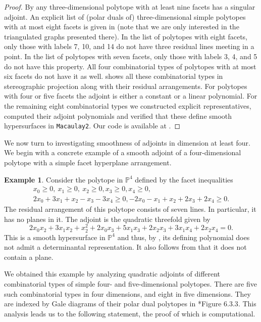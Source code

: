 \documentclass[a4paper,10pt]{amsart}
\theoremstyle{definition}
\newtheorem{ex}[Def]{Example}
\theoremstyle{plain}
\begin{document}
\begin{proof}
By  any three-dimensional polytope with at least nine facets has a singular adjoint. An explicit list of (polar duals of) three-dimensional simple polytopes with at most eight facets is given in \cite{BrittonDunitz73Polytopes} (note that we are only interested in the triangulated graphs presented there). In the list of polytopes with eight facets, only those with labels 7, 10, and 14 do not have three residual lines meeting in a point. In the list of polytopes with seven facets, only those with labels 3, 4, and 5 do not have this property. All four combinatorial types of polytopes with at most six facets do not have it as well.  shows all these combinatorial types in stereographic projection along with their residual arrangements. 
For polytopes with four or five facets the adjoint is either a constant or a linear polynomial. 
For the remaining eight combinatorial types we constructed explicit representatives, computed their adjoint polynomials and verified that these define smooth hypersurfaces in \texttt{Macaulay2}. Our code is available at \cite{detrepscode}.
\end{proof}

We now turn to investigating smoothness of adjoints in dimension at least four. We begin with  a concrete example of a smooth adjoint of a four-dimensional polytope with a simple facet hyperplane arrangement.

\begin{ex} \label{ex:counter}
    Consider the polytope in $\mathbb{P}^4$ defined by the facet inequalities
    \begin{multline*}
        x_0\geq 0,\ x_1\geq 0,\ x_2\geq 0, x_3\geq 0, x_4\geq 0,\\ 2x_0+3x_1+x_2-x_3-3x_4\geq 0,-2x_0-x_1+x_2+2x_3+2x_4\geq 0.
    \end{multline*}
    The residual arrangement of this polytope consists of seven lines. In particular, it has no planes in it. The adjoint is the quadratic threefold given by
    $$2x_0x_2 + 3x_1x_2 + x_2^2  + 2x_0x_3 + 5x_1x_3 + 2x_2x_3 + 3x_1x_4 + 2x_2x_4=0.$$
    This is a smooth hypersurface in $\mathbb{P}^4$ and thus, by , its defining polynomial does not admit a determinantal representation. It also follows from  that it does not contain a plane.
\end{ex}

We obtained this example by analyzing quadratic adjoints of different combinatorial types of simple four- and five-dimensional polytopes. There are five such combinatorial types in four dimensions, and eight in five dimensions. They are indexed by Gale diagrams of their polar dual polytopes in \cite{grunbaum1967convex}*{Figure 6.3.3}. This analysis leads us to the following statement, the proof of which is computational. 
\end{document}
